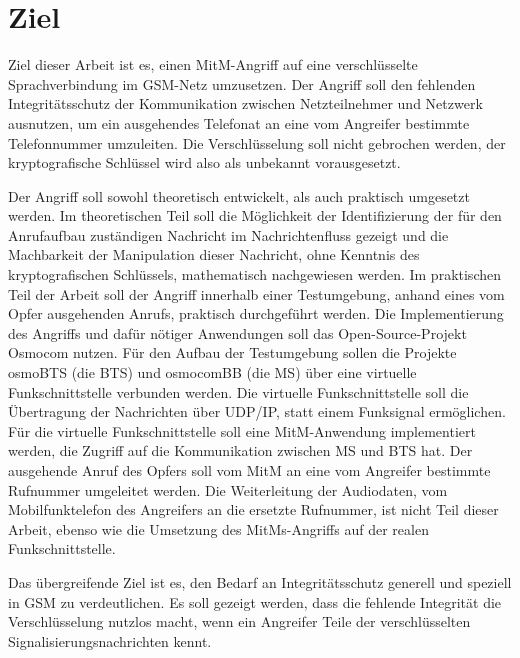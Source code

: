 \chapter{Ziel} \label{hdl:ziel}
Ziel dieser Arbeit ist es, einen \ac{MitM}-Angriff auf eine verschlüsselte Sprachverbindung im \ac{GSM}-Netz umzusetzen. Der Angriff soll den fehlenden Integritätsschutz der Kommunikation zwischen Netzteilnehmer und Netzwerk ausnutzen, um ein ausgehendes Telefonat an eine vom Angreifer bestimmte Telefonnummer umzuleiten. Die Verschlüsselung soll nicht gebrochen werden, der kryptografische Schlüssel wird also als unbekannt vorausgesetzt.

Der Angriff soll sowohl theoretisch entwickelt, als auch praktisch umgesetzt werden. Im theoretischen Teil soll die Möglichkeit der Identifizierung der für den Anrufaufbau zuständigen Nachricht im Nachrichtenfluss gezeigt und die Machbarkeit der Manipulation dieser Nachricht, ohne Kenntnis des kryptografischen Schlüssels, mathematisch nachgewiesen werden. Im praktischen Teil der Arbeit soll der Angriff innerhalb einer Testumgebung, anhand eines vom Opfer ausgehenden Anrufs, praktisch durchgeführt werden. Die Implementierung des Angriffs und dafür nötiger Anwendungen soll das Open-Source-Projekt Osmocom nutzen. Für den Aufbau der Testumgebung sollen die Projekte osmoBTS (die \ac{BTS}) und osmocomBB (die \ac{MS}) über eine virtuelle Funkschnittstelle verbunden werden. Die virtuelle Funkschnittstelle soll die Übertragung der Nachrichten über \ac{UDP}/\ac{IP}, statt einem Funksignal ermöglichen. Für die virtuelle Funkschnittstelle soll eine \ac{MitM}-Anwendung implementiert werden, die Zugriff auf die Kommunikation zwischen \ac{MS} und \ac{BTS} hat. Der ausgehende Anruf des Opfers soll vom \ac{MitM} an eine vom Angreifer bestimmte Rufnummer umgeleitet werden. Die Weiterleitung der Audiodaten, vom Mobilfunktelefon des Angreifers an die ersetzte Rufnummer, ist nicht Teil dieser Arbeit, ebenso wie die Umsetzung des \acp{MitM}-Angriffs auf der realen Funkschnittstelle.

Das übergreifende Ziel ist es, den Bedarf an Integritätsschutz generell und speziell in \ac{GSM} zu verdeutlichen. Es soll gezeigt werden, dass die fehlende Integrität die Verschlüsselung nutzlos macht, wenn ein Angreifer Teile der verschlüsselten Signalisierungsnachrichten kennt. 